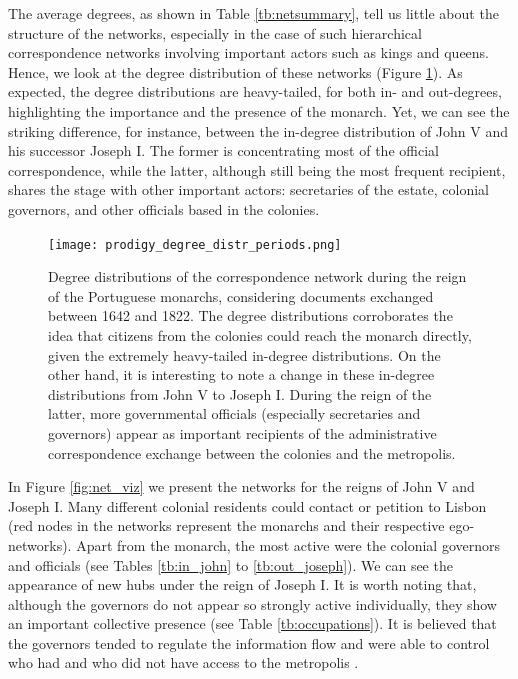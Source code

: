 \documentclass{article}
\begin{document}
The average degrees, as shown in Table \ref{tb:netsummary}, tell us little about the structure of the networks, especially in the case of such hierarchical correspondence networks involving important actors such as kings and queens. Hence, we look at the degree distribution of these networks (Figure \ref{fig:degree_dist}). As expected, the degree distributions are heavy-tailed, for both in- and out-degrees, highlighting the importance and the presence of the monarch. Yet, we can see the striking difference, for instance, between the in-degree distribution of John V and his successor Joseph I. The former is concentrating most of the official correspondence, while the latter, although still being the most frequent recipient, shares the stage with other important actors: secretaries of the estate, colonial governors, and other officials based in the colonies.

\begin{figure}
	\centering
	\texttt{[image: prodigy\_degree\_distr\_periods.png]}
	\caption{Degree distributions of the correspondence network during the reign of the Portuguese monarchs, considering documents exchanged between 1642 and 1822. The degree distributions corroborates the idea that citizens from the colonies could reach the monarch directly, given the extremely heavy-tailed in-degree distributions. On the other hand, it is interesting to note a change in these in-degree distributions from John V to Joseph I. During the reign of the latter, more governmental officials (especially secretaries and governors) appear as important recipients of the administrative correspondence exchange between the colonies and the metropolis. }
	\label{fig:degree_dist}
\end{figure}

In Figure \ref{fig:net_viz} we present the networks for the reigns of John V and Joseph I. Many different colonial residents could contact or petition to Lisbon (red nodes in the networks represent the monarchs and their respective ego-networks). Apart from the monarch, the most active were the colonial governors and officials (see Tables \ref{tb:in_john} to \ref{tb:out_joseph}). We can see the appearance of new hubs under the reign of Joseph I. It is worth noting that, although the governors do not appear so strongly active individually, they show an important collective presence (see Table \ref{tb:occupations}). It is believed that the governors tended to regulate the information flow and were able to control who had and who did not have access to the metropolis \cite{fragoso_um_2017}.
\end{document}
